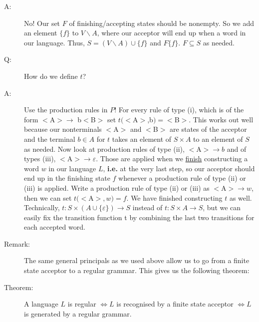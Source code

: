 \documentclass[10pt]{article}
\begin{document}
\begin{description}
		\item[A:] No! Our set $F$ of finishing/accepting states should be nonempty. So we add an element $\{f\}$ to $V \backslash A$, where our acceptor will end up when a word in our language. Thus, $S = (V \backslash A) \cup \{f\}$ and $F \{f\}$. $F \subseteq S$ as needed.
		\item[Q:] How do we define $t$?
		\item[A:] Use the production rules in $P$! For every rule of type (i), which is of the form $<$A$> \rightarrow$ b$<$B$>$ set $t(<$A$>$,b$) = <$B$>$. This works out well because our nonterminals $<$A$>$ and $<$B$>$ are states of the acceptor and the terminal $b \in A$ for $t$ takes an element of $S \times A$ to an element of $S$ as needed. Now look at production rules of type (ii), $<$A$> \rightarrow b$ and of types (iii), $<$A$> \rightarrow \varepsilon$. Those are applied when we \underline{finish} constructing a word $w$ in our language $L$, \textbf{i.e.} at the very last step, so our acceptor should end up in the finishing state $f$ whenever a production rule of type (ii) or (iii) is applied. Write a production rule of type (ii) or (iii) as $<$A$> \rightarrow w$, then we can set $t(<$A$>, w) = f$. We have finished constructing $t$ as well. Technically, $t:S \times (A \cup \{ \varepsilon \}) \rightarrow S$ instead of $t:S \times A \rightarrow S$, but we can easily fix the transition function t by combining the last two transitions for each accepted word.
		\item[Remark:] The same general principals as we used above allow us to go from a finite state acceptor to a regular grammar. This gives us the following theorem:
		\item[Theorem:] A language $L$ is regular $\Leftrightarrow L$ is recognised by a finite state acceptor $\Leftrightarrow L$ is generated by a regular grammar.
	\end{description}
	
\end{document}
